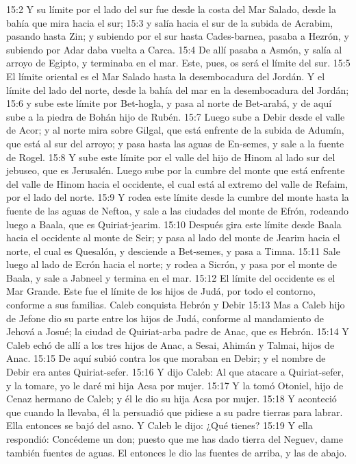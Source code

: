 15:2 Y su límite por el lado del sur fue desde la costa del Mar Salado, desde la bahía que mira hacia el sur;  
15:3 y salía hacia el sur de la subida de Acrabim, pasando hasta Zin; y subiendo por el sur hasta Cades-barnea, pasaba a Hezrón, y subiendo por Adar daba vuelta a Carca.  
15:4 De allí pasaba a Asmón, y salía al arroyo de Egipto, y terminaba en el mar. Este, pues, os será el límite del sur.  
15:5 El límite oriental es el Mar Salado hasta la desembocadura del Jordán. Y el límite del lado del norte, desde la bahía del mar en la desembocadura del Jordán;  
15:6 y sube este límite por Bet-hogla, y pasa al norte de Bet-arabá, y de aquí sube a la piedra de Bohán hijo de Rubén.  
15:7 Luego sube a Debir desde el valle de Acor; y al norte mira sobre Gilgal, que está enfrente de la subida de Adumín, que está al sur del arroyo; y pasa hasta las aguas de En-semes, y sale a la fuente de Rogel.  
15:8 Y sube este límite por el valle del hijo de Hinom al lado sur del jebuseo, que es Jerusalén. Luego sube por la cumbre del monte que está enfrente del valle de Hinom hacia el occidente, el cual está al extremo del valle de Refaim, por el lado del norte.  
15:9 Y rodea este límite desde la cumbre del monte hasta la fuente de las aguas de Neftoa, y sale a las ciudades del monte de Efrón, rodeando luego a Baala, que es Quiriat-jearim.  
15:10 Después gira este límite desde Baala hacia el occidente al monte de Seir; y pasa al lado del monte de Jearim hacia el norte, el cual es Quesalón, y desciende a Bet-semes, y pasa a Timna.  
15:11 Sale luego al lado de Ecrón hacia el norte; y rodea a Sicrón, y pasa por el monte de Baala, y sale a Jabneel y termina en el mar.  
15:12 El límite del occidente es el Mar Grande. Este fue el límite de los hijos de Judá, por todo el contorno, conforme a sus familias.  
Caleb conquista Hebrón y Debir   
15:13 Mas a Caleb hijo de Jefone dio su parte entre los hijos de Judá, conforme al mandamiento de Jehová a Josué; la ciudad de Quiriat-arba padre de Anac, que es Hebrón. 
15:14 Y Caleb echó de allí a los tres hijos de Anac, a Sesai, Ahimán y Talmai, hijos de Anac. 
15:15 De aquí subió contra los que moraban en Debir; y el nombre de Debir era antes Quiriat-sefer.  
15:16 Y dijo Caleb: Al que atacare a Quiriat-sefer, y la tomare, yo le daré mi hija Acsa por mujer.  
15:17 Y la tomó Otoniel, hijo de Cenaz hermano de Caleb; y él le dio su hija Acsa por mujer.  
15:18 Y aconteció que cuando la llevaba, él la persuadió que pidiese a su padre tierras para labrar. Ella entonces se bajó del asno. Y Caleb le dijo: ¿Qué tienes?  
15:19 Y ella respondió: Concédeme un don; puesto que me has dado tierra del Neguev, dame también fuentes de aguas. El entonces le dio las fuentes de arriba, y las de abajo.  
